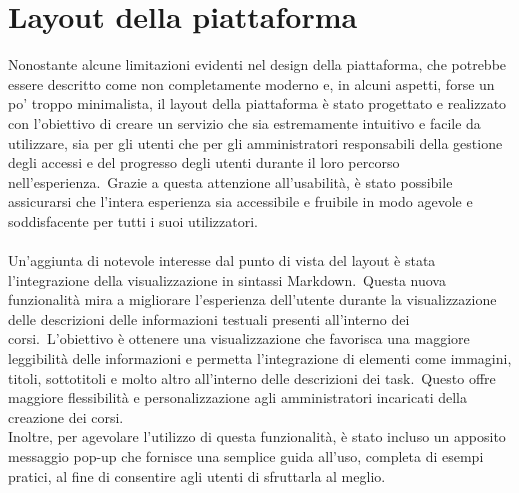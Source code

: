 \section{Layout della piattaforma}\label{sec:cap_sec_subsec}
Nonostante alcune limitazioni evidenti nel design della piattaforma, che potrebbe essere descritto come non completamente moderno e, 
in alcuni aspetti, forse un po' troppo minimalista, il layout della piattaforma è stato progettato e realizzato con l'obiettivo di 
creare un servizio che sia estremamente intuitivo e facile da utilizzare, sia per gli utenti 
che per gli amministratori responsabili della gestione degli accessi e del progresso degli utenti 
durante il loro percorso nell'esperienza.\ Grazie a questa attenzione all'usabilità, 
è stato possibile assicurarsi che l'intera esperienza sia accessibile e fruibile in modo agevole 
e soddisfacente per tutti i suoi utilizzatori.
\\ \\
Un'aggiunta di notevole interesse dal punto di vista del layout è stata l'integrazione 
della visualizzazione in sintassi Markdown.\ Questa nuova funzionalità mira a migliorare 
l'esperienza dell'utente durante la visualizzazione delle descrizioni delle informazioni 
testuali presenti all'interno dei corsi.\ L'obiettivo è ottenere una visualizzazione che 
favorisca una maggiore leggibilità delle informazioni e permetta l'integrazione di 
elementi come immagini, titoli, sottotitoli e molto altro all'interno delle descrizioni 
dei task.\ Questo offre maggiore flessibilità e personalizzazione agli amministratori 
incaricati della creazione dei corsi.
\\
Inoltre, per agevolare l'utilizzo di questa funzionalità, è stato incluso un apposito 
messaggio pop-up che fornisce una semplice guida all'uso, completa di esempi pratici, 
al fine di consentire agli utenti di sfruttarla al meglio.
